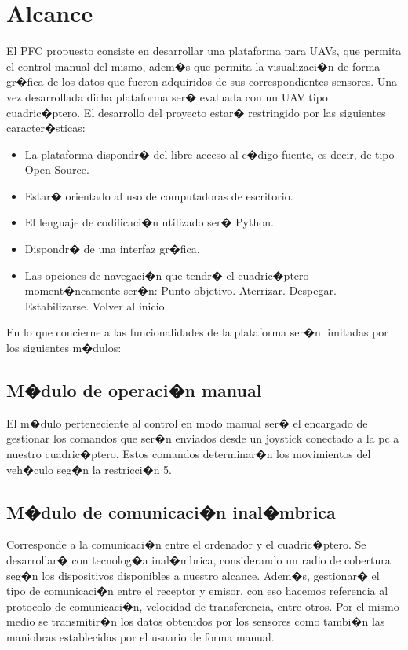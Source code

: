 \section{Alcance}

El PFC propuesto consiste en desarrollar una plataforma para UAVs, que permita el control manual del mismo, adem�s que permita la visualizaci�n de forma gr�fica de los datos que fueron adquiridos de sus correspondientes sensores. Una vez desarrollada dicha plataforma ser� evaluada con un UAV tipo cuadric�ptero. El desarrollo del proyecto estar� restringido por las siguientes caracter�sticas:

\begin{itemize}
	\item La plataforma dispondr� del libre acceso al c�digo fuente, es decir, de tipo Open Source.
	\item Estar� orientado al uso de computadoras de escritorio.
	\item El lenguaje de codificaci�n utilizado ser� Python.
	\item Dispondr� de una interfaz gr�fica.
	\item Las opciones de navegaci�n que tendr� el cuadric�ptero moment�neamente ser�n:
		\subitem Punto objetivo.
		\subitem Aterrizar.
		\subitem Despegar.
		\subitem Estabilizarse.
		\subitem Volver al inicio.
\end{itemize}

En lo que concierne a las funcionalidades de la plataforma ser�n limitadas por los siguientes m�dulos:

	\subsection{M�dulo de operaci�n manual}
	
		El m�dulo perteneciente al control en modo manual ser� el encargado de gestionar los comandos que ser�n enviados desde un joystick conectado a la pc a nuestro cuadric�ptero. Estos comandos determinar�n los movimientos del veh�culo seg�n la restricci�n 5. 
		
	\subsection{M�dulo de comunicaci�n inal�mbrica}
		Corresponde a la comunicaci�n entre el ordenador y el cuadric�ptero. Se desarrollar� con tecnolog�a inal�mbrica, considerando un radio de cobertura seg�n los dispositivos disponibles a nuestro alcance. Adem�s, gestionar� el tipo de comunicaci�n entre el receptor y emisor, con eso hacemos referencia al protocolo de comunicaci�n, velocidad de transferencia, entre otros. Por el mismo medio se transmitir�n los datos obtenidos por los 	sensores como tambi�n las maniobras establecidas por el usuario de forma manual.
	
